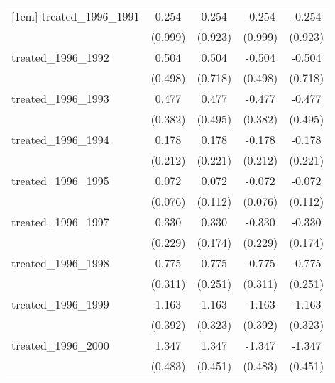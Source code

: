 {\begin{tabular}{l*{4}{c}}
[1em]
treated\_1996\_1991&       0.254         &       0.254         &      -0.254         &      -0.254         \\
            &     (0.999)         &     (0.923)         &     (0.999)         &     (0.923)         \\
[1em]
treated\_1996\_1992&       0.504         &       0.504         &      -0.504         &      -0.504         \\
            &     (0.498)         &     (0.718)         &     (0.498)         &     (0.718)         \\
[1em]
treated\_1996\_1993&       0.477         &       0.477         &      -0.477         &      -0.477         \\
            &     (0.382)         &     (0.495)         &     (0.382)         &     (0.495)         \\
[1em]
treated\_1996\_1994&       0.178         &       0.178         &      -0.178         &      -0.178         \\
            &     (0.212)         &     (0.221)         &     (0.212)         &     (0.221)         \\
[1em]
treated\_1996\_1995&       0.072         &       0.072         &      -0.072         &      -0.072         \\
            &     (0.076)         &     (0.112)         &     (0.076)         &     (0.112)         \\
[1em]
treated\_1996\_1997&       0.330         &       0.330         &      -0.330         &      -0.330         \\
            &     (0.229)         &     (0.174)         &     (0.229)         &     (0.174)         \\
[1em]
treated\_1996\_1998&       0.775\sym{*}  &       0.775\sym{**} &      -0.775\sym{*}  &      -0.775\sym{**} \\
            &     (0.311)         &     (0.251)         &     (0.311)         &     (0.251)         \\
[1em]
treated\_1996\_1999&       1.163\sym{**} &       1.163\sym{***}&      -1.163\sym{**} &      -1.163\sym{***}\\
            &     (0.392)         &     (0.323)         &     (0.392)         &     (0.323)         \\
[1em]
treated\_1996\_2000&       1.347\sym{**} &       1.347\sym{**} &      -1.347\sym{**} &      -1.347\sym{**} \\
            &     (0.483)         &     (0.451)         &     (0.483)         &     (0.451)         \\

\end{tabular}}
